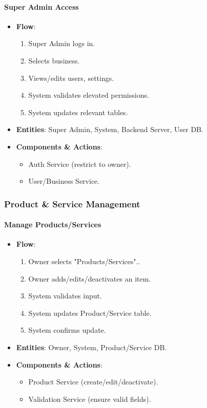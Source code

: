 \documentclass[]{VUMIFTemplateClass}
\begin{document}
\paragraph{Super Admin Access}

\begin{itemize}
    \item \textbf{Flow}: \begin{enumerate}
    \item Super Admin logs in.
    \item Selects business.
    \item Views/edits users, settings.
    \item System validates elevated permissions.
    \item System updates relevant tables.
    \end{enumerate}
    \item \textbf{Entities}: Super Admin, System, Backend Server, User DB.
    \item \textbf{Components \& Actions}: \begin{itemize}
        \item Auth Service (restrict to owner).
        \item User/Business Service.
    \end{itemize}
\end{itemize}

\subsubsection{Product \& Service Management}
\paragraph{Manage Products/Services}

\begin{itemize}
    \item \textbf{Flow}: \begin{enumerate}
    \item Owner selects "Products/Services"..
    \item Owner adds/edits/deactivates an item.
    \item System validates input.
    \item System updates Product/Service table.
    \item System confirms update.
    \end{enumerate}
    \item \textbf{Entities}: Owner, System, Product/Service DB.
    \item \textbf{Components \& Actions}: \begin{itemize}
        \item Product Service (create/edit/deactivate).
        \item Validation Service (ensure valid fields).
    \end{itemize}
\end{itemize}
\end{document}
